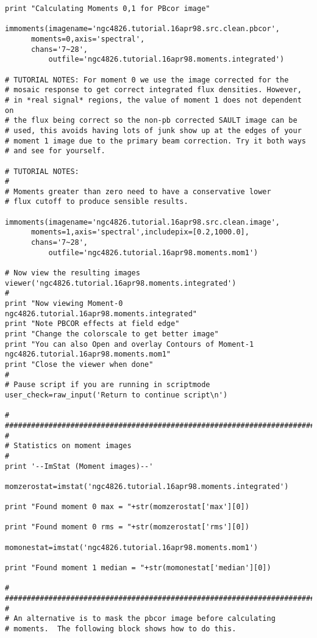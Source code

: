 \begin{verbatim}
print "Calculating Moments 0,1 for PBcor image"

immoments(imagename='ngc4826.tutorial.16apr98.src.clean.pbcor',
	  moments=0,axis='spectral',
	  chans='7~28',
          outfile='ngc4826.tutorial.16apr98.moments.integrated') 

# TUTORIAL NOTES: For moment 0 we use the image corrected for the
# mosaic response to get correct integrated flux densities. However,
# in *real signal* regions, the value of moment 1 does not dependent on
# the flux being correct so the non-pb corrected SAULT image can be
# used, this avoids having lots of junk show up at the edges of your
# moment 1 image due to the primary beam correction. Try it both ways
# and see for yourself.

# TUTORIAL NOTES:
#
# Moments greater than zero need to have a conservative lower
# flux cutoff to produce sensible results.

immoments(imagename='ngc4826.tutorial.16apr98.src.clean.image',
	  moments=1,axis='spectral',includepix=[0.2,1000.0],
	  chans='7~28',
          outfile='ngc4826.tutorial.16apr98.moments.mom1') 

# Now view the resulting images
viewer('ngc4826.tutorial.16apr98.moments.integrated')
#
print "Now viewing Moment-0 ngc4826.tutorial.16apr98.moments.integrated"
print "Note PBCOR effects at field edge"
print "Change the colorscale to get better image"
print "You can also Open and overlay Contours of Moment-1 ngc4826.tutorial.16apr98.moments.mom1"
print "Close the viewer when done"
#
# Pause script if you are running in scriptmode
user_check=raw_input('Return to continue script\n')

#
##########################################################################
#
# Statistics on moment images
#
print '--ImStat (Moment images)--'

momzerostat=imstat('ngc4826.tutorial.16apr98.moments.integrated')

print "Found moment 0 max = "+str(momzerostat['max'][0])

print "Found moment 0 rms = "+str(momzerostat['rms'][0])

momonestat=imstat('ngc4826.tutorial.16apr98.moments.mom1')

print "Found moment 1 median = "+str(momonestat['median'][0])

#
##########################################################################
#
# An alternative is to mask the pbcor image before calculating
# moments.  The following block shows how to do this.


\end{verbatim}
